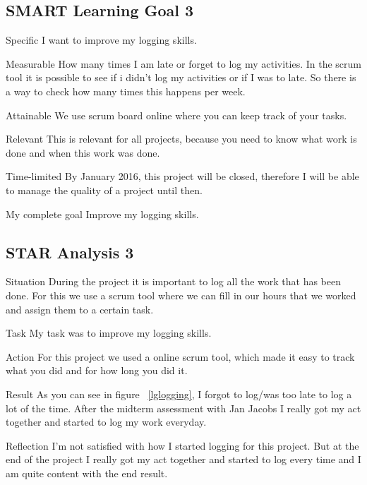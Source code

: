 \documentclass[12pt]{article}
\begin{document}
	\subsection{SMART Learning Goal 3}
	\begin{SMART}
	    \item[Specific] I want to improve my logging skills.
	    \item[Measurable] How many times I am late or forget to log my activities. In the scrum tool it is possible to see if i didn't log my activities or if I was to late. So there is a way to check how many times this happens per week.
	    \item[Attainable] We use scrum board online where you can keep track of your tasks.
	    \item[Relevant] This is relevant for all projects, because you need to know what work is done and when this work was done.
	    \item[Time-limited] By January 2016, this project will be closed, therefore I will be able to manage the quality of a project until then.
	    \item[My complete goal] Improve my logging skills.
	\end{SMART}
	
	\subsection{STAR Analysis 3}
	\begin{STAR}
	    \item[Situation] During the project it is important to log all the work that has been done. For this we use a scrum tool where we can fill in our hours that we worked and assign them to a certain task.
	    \item[Task] My task was to improve my logging skills.
	    \item[Action] For this project we used a online scrum tool, which made it easy to track what you did and for how long you did it. 
	    \item[Result] As you can see in figure ~\ref{lglogging}, I forgot to log/was too late to log a lot of the time. After the midterm assessment with Jan Jacobs I really got my act together and started to log my work everyday.
	    \item[Reflection] I'm not satisfied with how I started logging for this project. But at the end of the project I really got my act together and started to log every time and I am quite content with the end result.
	\end{STAR}
	
\end{document}

